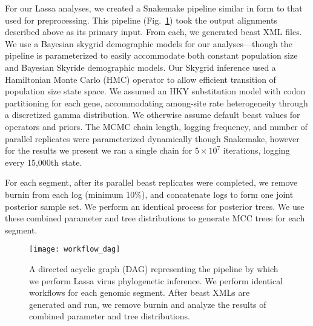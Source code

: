 For our Lassa analyses, we created a Snakemake pipeline similar in form to that used for preprocessing.
This pipeline (Fig.~\ref{fig:workflow_dag}) took the output alignments described above as its primary input.
From each, we generated \gls{beast} XML files.
We use a Bayesian skygrid demographic models for our analyses---though the pipeline is parameterized to easily accommodate both constant population size and Bayesian Skyride demographic models.
Our Skygrid inference used a Hamiltonian Monte Carlo (HMC) operator to allow efficient transition of population size state space. %
We assumed an HKY substitution model with codon partitioning for each gene, accommodating among-site rate heterogeneity through a discretized gamma distribution.
We otherwise assume default \gls{beast} values for operators and priors.
The MCMC chain length, logging frequency, and number of parallel replicates were parameterized dynamically though Snakemake, however for the results we present we ran a single chain for $5\times10^7$ iterations, logging every 15,000th state.

For each segment, after its parallel \gls{beast} replicates were completed, we remove burnin from each log (minimum 10\%), and concatenate logs to form one joint posterior sample set.
We perform an identical process for posterior trees.
We use these combined parameter and tree distributions to generate MCC trees for each segment.

\begin{figure}[ht]
  \centering
  \medskip
  \texttt{[image: workflow\_dag]}
  \caption[Lassa phylogenetics pipeline]{A directed acyclic graph (DAG) representing the pipeline by which we perform Lassa virus phylogenetic inference. We perform identical workflows for each genomic segment. After \gls{beast} XMLs are generated and run, we remove burnin and analyze the results of combined parameter and tree distributions.}
  \label{fig:workflow_dag}
\end{figure}

\cleardoublepage

